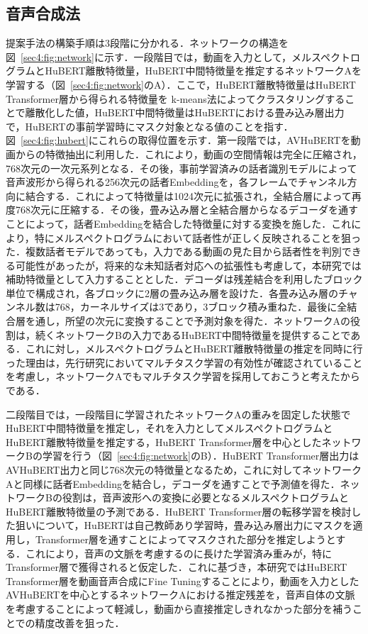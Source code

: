 \documentclass[12pt]{jarticle}
\numberwithin{equation}{section}    %
\numberwithin{figure}{section}      %
\numberwithin{table}{section}      %
\begin{document}
\subsection{音声合成法}
提案手法の構築手順は3段階に分かれる．ネットワークの構造を図~\ref{sec4:fig:network}に示す．一段階目では，動画を入力として，メルスペクトログラムとHuBERT離散特徴量，HuBERT中間特徴量を推定するネットワークAを学習する（図~\ref{sec4:fig:network}のA）．ここで，HuBERT離散特徴量はHuBERT Transformer層から得られる特徴量を k-means法によってクラスタリングすることで離散化した値，HuBERT中間特徴量はHuBERTにおける畳み込み層出力で，HuBERTの事前学習時にマスク対象となる値のことを指す．図~\ref{sec4:fig:hubert}にこれらの取得位置を示す．第一段階では，AVHuBERTを動画からの特徴抽出に利用した．これにより，動画の空間情報は完全に圧縮され，768次元の一次元系列となる．その後，事前学習済みの話者識別モデル\cite{wan2018generalized}によって音声波形から得られる256次元の話者Embeddingを，各フレームでチャンネル方向に結合する．これによって特徴量は1024次元に拡張され，全結合層によって再度768次元に圧縮する．その後，畳み込み層と全結合層からなるデコーダを通すことによって，話者Embeddingを結合した特徴量に対する変換を施した．これにより，特にメルスペクトログラムにおいて話者性が正しく反映されることを狙った．複数話者モデルであっても，入力である動画の見た目から話者性を判別できる可能性があったが，将来的な未知話者対応への拡張性も考慮して，本研究では補助特徴量として入力することとした．デコーダは残差結合を利用したブロック単位で構成され，各ブロックに2層の畳み込み層を設けた．各畳み込み層のチャンネル数は768，カーネルサイズは3であり，3ブロック積み重ねた．最後に全結合層を通し，所望の次元に変換することで予測対象を得た．ネットワークAの役割は，続くネットワークBの入力であるHuBERT中間特徴量を提供することである．これに対し，メルスペクトログラムとHuBERT離散特徴量の推定を同時に行った理由は，先行研究においてマルチタスク学習の有効性が確認されていることを考慮し，ネットワークAでもマルチタスク学習を採用しておこうと考えたからである．

二段階目では，一段階目に学習されたネットワークAの重みを固定した状態でHuBERT中間特徴量を推定し，それを入力としてメルスペクトログラムとHuBERT離散特徴量を推定する，HuBERT Transformer層を中心としたネットワークBの学習を行う（図~\ref{sec4:fig:network}のB）．HuBERT Transformer層出力はAVHuBERT出力と同じ768次元の特徴量となるため，これに対してネットワークAと同様に話者Embeddingを結合し，デコーダを通すことで予測値を得た．ネットワークBの役割は，音声波形への変換に必要となるメルスペクトログラムとHuBERT離散特徴量の予測である．HuBERT Transformer層の転移学習を検討した狙いについて，HuBERTは自己教師あり学習時，畳み込み層出力にマスクを適用し，Transformer層を通すことによってマスクされた部分を推定しようとする．これにより，音声の文脈を考慮するのに長けた学習済み重みが，特にTransformer層で獲得されると仮定した．これに基づき，本研究ではHuBERT Transformer層を動画音声合成にFine Tuningすることにより，動画を入力としたAVHuBERTを中心とするネットワークAにおける推定残差を，音声自体の文脈を考慮することによって軽減し，動画から直接推定しきれなかった部分を補うことでの精度改善を狙った．
\end{document}

